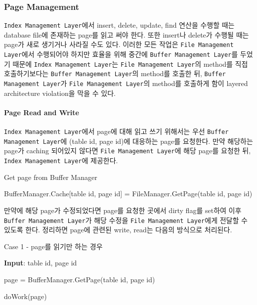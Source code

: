 \documentclass[main.tex]{subfiles}
\begin{document}
\subsubsection{Page Management}
\texttt{Index Management Layer}에서 insert, delete, update, find 연산을 수행할 때는 database file에 존재하는 page를 읽고 써야 한다. 또한 insert나 delete가 수행될 때는 page가 새로 생기거나 사라질 수도 있다. 이러한 모든 작업은 \texttt{File Management Layer}에서 수행되어야 하지만 효율을 위해 중간에 \texttt{Buffer Management Layer}를 두었기 때문에 \texttt{Index Management Layer}는 \texttt{File Management Layer}의 method를 직접 호출하기보다는 \texttt{Buffer Management Layer}의 method를 호출한 뒤, \texttt{Buffer Management Layer}가 \texttt{File Management Layer}의 method를 호출하게 함이 layered architecture violation을 막을 수 있다.

\paragraph{Page Read and Write}
\texttt{Index Management Layer}에서 page에 대해 읽고 쓰기 위해서는 우선 \texttt{Buffer Management Layer}에 (table id, page id)에 대응하는 page를 요청한다. 만약 해당하는 page가 caching 되어있지 않다면 \texttt{File Management Layer}에 해당 page를 요청한 뒤, \texttt{Index Management Layer}에 제공한다.

\begin{algorithm}
	\caption{Get page from Buffer Manager}
	\begin{algorithmic}
				\State BufferManager.Cache[table id, page id] = FileManager.GetPage(table id, page id)
			\EndIf
			
			\State {}
		\EndFunction
	\end{algorithmic}
\end{algorithm}

만약에 해당 page가 수정되었다면 page를 요청한 곳에서 dirty flag를 set하여 이후 \texttt{Buffer Management Layer}가 해당 수정을 \texttt{File Management Layer}에게 전달할 수 있도록 한다.
정리하면 page에 관련된 write, read는 다음의 방식으로 처리된다.

\begin{algorithm}
	\caption{Case 1 - page를 읽기만 하는 경우}
	
	\hspace*{8pt} \textbf{Input}: table id, page id\\
	
	\begin{algorithmic}
		\State page = BufferManager.GetPage(table id, page id)
		
		\State doWork(page)
	\end{algorithmic}
\end{algorithm}
\end{document}
